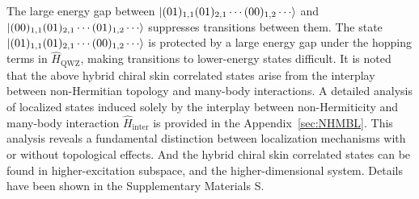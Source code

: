 \documentclass[longbibliography, aps, prx, amsmath, amssymb, amsfonts, twocolumn,superscriptaddress, footinbib]{revtex4-1}
\begin{document}
	The large energy gap between $\ket{(01)_{1,1}(01)_{2,1}\cdots(00)_{1,2}\cdots}$ and $\ket{(00)_{1,1}(01)_{2,1}\cdots(01)_{1,2}\cdots}$ suppresses transitions between them. 
	The state $\ket{(01)_{1,1}(01)_{2,1}\cdots(00)_{1,2}\cdots}$ is protected by a large energy gap under the hopping terms in $\hat{H}_{\text{QWZ}}$, making transitions to lower-energy states difficult. 
    It is noted that the above hybrid chiral skin correlated states arise from the interplay between non-Hermitian topology and many-body interactions. A detailed analysis of localized states induced solely by the interplay between non-Hermiticity and many-body interaction $\hat{H}_{\text{inter}}$ is provided in the Appendix~\ref{sec:NHMBL}.
	This analysis reveals a fundamental distinction between localization mechanisms with or without topological effects.
	And the hybrid chiral skin correlated states can be found in higher-excitation subspace, and the higher-dimensional system. Details have been shown in the Supplementary Materials S.
    {}
\end{document}
